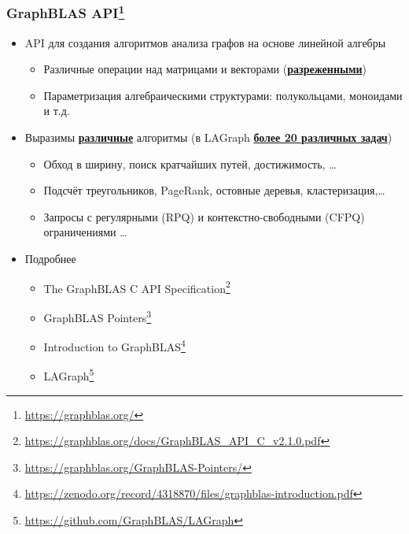 \documentclass[xcolor=table,aspectratio=169]{beamer}
\begin{document}
\begin{frame}[fragile]
  \frametitle{GraphBLAS API\footnote{\url{https://graphblas.org/}}}
  \begin{itemize}
    \item API для создания алгоритмов анализа графов на основе линейной алгебры 
    \begin{itemize}
      \item Различные операции над матрицами и векторами (\underline{\textbf{разреженными}})
      \item Параметризация алгебраическими структурами: полукольцами, моноидами и т.д.
    \end{itemize}
    \item Выразимы \underline{\textbf{различные}} алгоритмы (в LAGraph \underline{\textbf{более 20 различных задач}})
    \begin{itemize}
      \item Обход в ширину, поиск кратчайших путей, достижимость, \ldots
      \item Подсчёт треугольников, PageRank, остовные деревья, кластеризация,\ldots
      \item Запросы с регулярными (RPQ) и контекстно-свободными (CFPQ) ограничениями \ldots      
    \end{itemize}
    \item Подробнее
    \begin{itemize}
      \item The GraphBLAS C API Specification\footnote{\url{https://graphblas.org/docs/GraphBLAS_API_C_v2.1.0.pdf}}
      \item GraphBLAS Pointers\footnote{\url{https://graphblas.org/GraphBLAS-Pointers/}}
      \item Introduction to GraphBLAS\footnote{\url{https://zenodo.org/record/4318870/files/graphblas-introduction.pdf}}
      \item LAGraph\footnote{\url{https://github.com/GraphBLAS/LAGraph}}
    \end{itemize}
    \end{itemize}
\end{frame}
\end{document}
